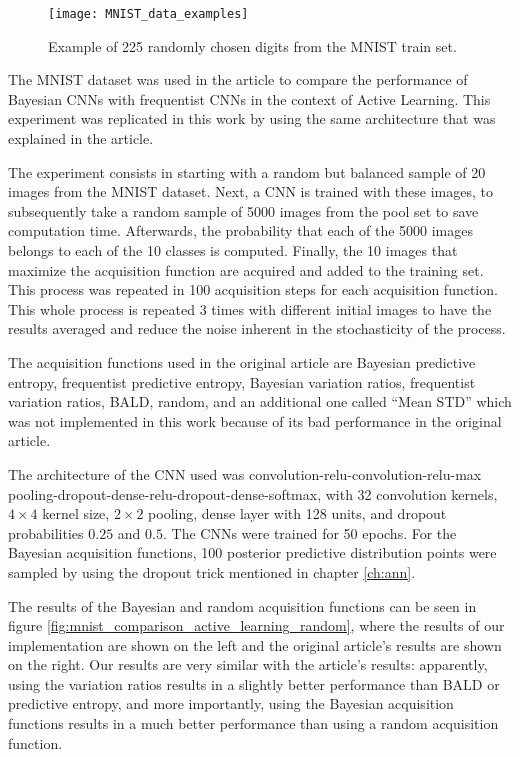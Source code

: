 \begin{figure}[H]
    \centering
    \texttt{[image: MNIST\_data\_examples]}
    \caption{Example of 225 randomly chosen digits from the MNIST train set.}
    \label{fig:MNIST_data_examples}
\end{figure}

The MNIST dataset was used in the article \cite{Gal2016Active} to compare the performance of Bayesian CNNs with frequentist CNNs in the context of Active Learning. This experiment was replicated in this work by using the same architecture that was explained in the article.

The experiment consists in starting with a random but balanced sample of 20 images from the MNIST dataset. Next, a CNN is trained with these images, to subsequently take a random sample of 5000 images from the pool set to save computation time. Afterwards, the probability that each of the 5000 images belongs to each of the 10 classes is computed. Finally, the 10 images that maximize the acquisition function are acquired and added to the training set. This process was repeated in 100 acquisition steps for each acquisition function. This whole process is repeated 3 times with different initial images to have the results averaged and reduce the noise inherent in the stochasticity of the process.

The acquisition functions used in the original article are Bayesian predictive entropy, frequentist predictive entropy, Bayesian variation ratios, frequentist variation ratios, BALD, random, and an additional one called ``Mean STD'' which was not implemented in this work because of its bad performance in the original article.

The architecture of the CNN used was convolution-relu-convolution-relu-max pooling-dropout-dense-relu-dropout-dense-softmax, with 32 convolution kernels, $4 \times 4$ kernel size, $2 \times 2$ pooling, dense layer with 128 units, and dropout probabilities $0.25$ and $0.5$. The CNNs were trained for 50 epochs. For the Bayesian acquisition functions, 100 posterior predictive distribution points were sampled by using the dropout trick mentioned in chapter \ref{ch:ann}.

The results of the Bayesian and random acquisition functions can be seen in figure \ref{fig:mnist_comparison_active_learning_random}, where the results of our implementation are shown on the left and the original article's results are shown on the right. Our results are very similar with the article's results: apparently, using the variation ratios results in a slightly better performance than BALD or predictive entropy, and more importantly, using the Bayesian acquisition functions results in a much better performance than using a random acquisition function.

